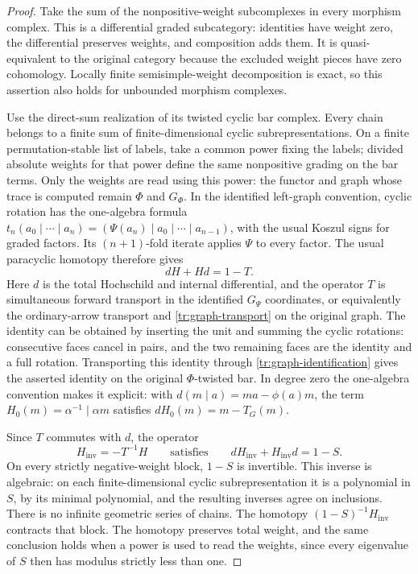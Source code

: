 \begin{proof}
Take the sum of the nonpositive-weight subcomplexes in every morphism
complex.  This is a differential graded subcategory: identities have
weight zero, the differential preserves weights, and composition adds
them.  It is quasi-equivalent to the original category because the
excluded weight pieces have zero cohomology.  Locally finite
semisimple-weight decomposition is exact, so this assertion also holds
for unbounded morphism complexes.

Use the direct-sum realization of its twisted cyclic bar complex.
Every chain belongs to a finite sum of finite-dimensional cyclic
subrepresentations.  On a finite permutation-stable list of labels,
take a common power fixing the labels; divided absolute weights for
that power define the same nonpositive grading on the bar terms.
Only the weights are read using this power: the functor and graph
whose trace is computed remain $\Phi$ and $G_\Phi$.
In the identified left-graph convention, cyclic rotation has the
one-algebra formula
$t_n(a_0\mid\cdots\mid a_n)
 =(\Psi(a_n)\mid a_0\mid\cdots\mid a_{n-1})$,
with the usual Koszul signs for graded factors.
Its $(n+1)$-fold iterate applies $\Psi$ to every factor.
The usual paracyclic homotopy therefore gives
\begin{equation}\label{tr:paracyclic}
 dH+Hd=1-T.
\end{equation}
Here $d$ is the total Hochschild and internal differential, and the
operator $T$ is simultaneous forward transport in the identified
$G_\Psi$ coordinates, or equivalently the ordinary-arrow transport
and \eqref{tr:graph-transport} on the original graph.  The identity can be obtained
by inserting the unit and summing the cyclic rotations: consecutive
faces cancel in pairs, and the two remaining faces are the identity
and a full rotation.  Transporting this identity through
\eqref{tr:graph-identification} gives the asserted identity on the
original $\Phi$-twisted bar.  In degree zero the one-algebra convention
makes it explicit: with $d(m\mid a)=ma-\phi(a)m$, the term
$H_0(m)=\alpha^{-1}\mid\alpha m$ satisfies
$dH_0(m)=m-T_G(m)$.

Since $T$ commutes with $d$, the operator
\begin{equation}\label{tr:inverse-homotopy}
 H_{\mathrm{inv}}=-T^{-1}H
 \qquad\text{satisfies}\qquad
 dH_{\mathrm{inv}}+H_{\mathrm{inv}}d=1-S.
\end{equation}
On every strictly negative-weight block, $1-S$ is invertible.
This inverse is algebraic: on each finite-dimensional cyclic
subrepresentation it is a polynomial in $S$, by its minimal
polynomial, and the resulting inverses agree on inclusions.
There is no infinite geometric series of chains.
The homotopy $(1-S)^{-1}H_{\mathrm{inv}}$ contracts that block.
The homotopy preserves total weight, and the same conclusion holds
when a power is used to read the weights, since every eigenvalue of
$S$ then has modulus strictly less than one.


\end{proof}
